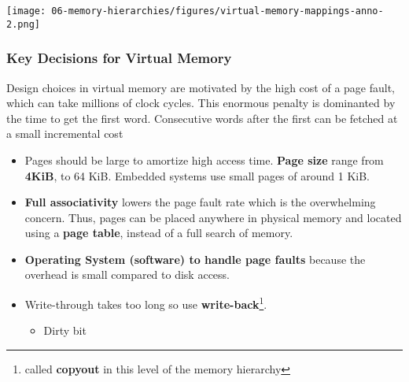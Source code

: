 \begin{frame}[fragile]
\bigskip
{\texttt{[image: 06-memory-hierarchies/figures/virtual-memory-mappings-anno-2.png]}}
\end{frame}

\begin{frame}[fragile]\frametitle{Key Decisions for Virtual Memory}

Design choices in virtual memory are motivated by the high cost of a page fault, which can take millions of clock cycles. This enormous penalty is dominanted by the time to get the first word. Consecutive words after the first can be fetched at a small incremental cost 


\begin{itemize}
\item Pages should be large to amortize high access time. \textbf{Page size} range from \textbf{4KiB}, to 64 KiB. Embedded systems use small pages of around 1 KiB. 

\item \textbf{Full associativity }lowers the page fault rate which is the overwhelming concern. Thus, pages can be placed anywhere in physical memory and located using a \textbf{page table}, instead of a full search of memory.

\item \textbf{Operating System (software) to handle page faults} because the overhead is small compared to disk access.

\item Write-through takes too long so use \textbf{write-back}\footnote{called \textbf{copyout} in this level of the memory hierarchy}.\begin{itemize}
    \item Dirty bit
\end{itemize}
\end{itemize}

\end{frame}



